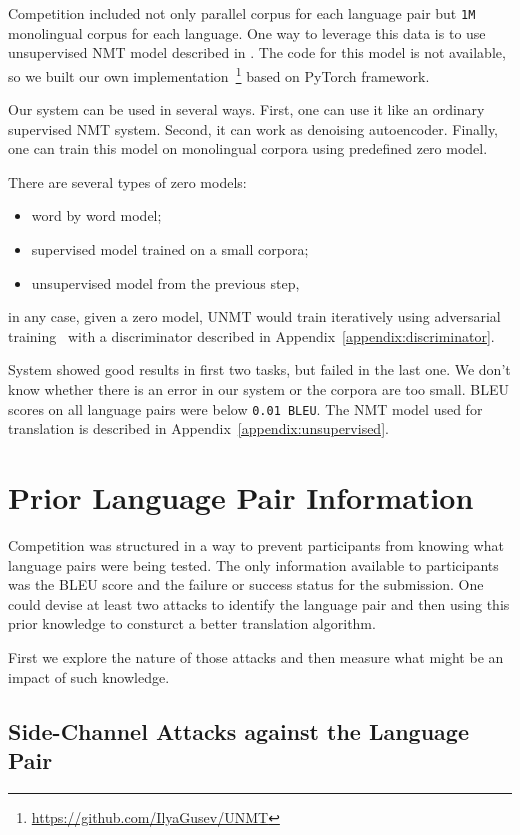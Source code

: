 \documentclass[]{article}
\begin{document}
Competition included not only parallel corpus for each language pair but  {\tt 1M} monolingual corpus for each language.
One way to leverage this data is to use unsupervised NMT model described in \cite{DBLP:journals/corr/abs-1711-00043}.
The code for this model is not available, so we built our own implementation~\footnote{\url{https://github.com/IlyaGusev/UNMT}} based on PyTorch framework. 

Our system can be used in several ways.
First, one can use it like an ordinary supervised NMT system.
Second, it can work as denoising autoencoder.
Finally, one can train this model on monolingual corpora using predefined zero model.

There are several types of zero models:
\begin{itemize}
\item word by word model;
\item supervised model trained on a small corpora;
\item unsupervised model from the previous step,
\end{itemize}
in any case, given a zero model, UNMT would train iteratively using adversarial training~\citep{goodfellow2016nips} with a discriminator described in Appendix~\ref{appendix:discriminator}.

System showed good results in first two tasks, but failed in the last one.
We don't know whether there is an error in our system or the corpora are too small.
BLEU scores on all language pairs were below {\tt 0.01 BLEU}.
The NMT model used for translation is described in Appendix~\ref{appendix:unsupervised}.

\section{Prior Language Pair Information}
\label{sect:nonoblivious}

Competition was structured in a way to prevent participants from knowing what language pairs were being tested.
The only information available to participants was the BLEU score and the failure or success status for the submission.
One could devise at least two attacks to identify the language pair and then using this prior knowledge to consturct a better translation algorithm.

First we explore the nature of those attacks and then measure what might be an impact of such knowledge.

\subsection{Side-Channel Attacks against the Language Pair}
\label{sect:attack}
\end{document}
